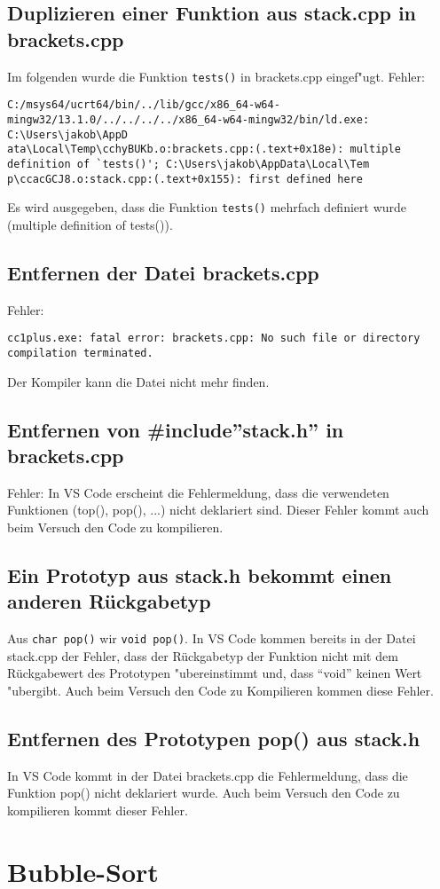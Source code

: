 \documentclass[a4paper,11pt,titlepage]{article}
\begin{document}
\subsection{Duplizieren einer Funktion aus stack.cpp in brackets.cpp}
Im folgenden wurde die Funktion \verb+tests()+ in brackets.cpp eingef"ugt.
Fehler:\\
\begin{verbatim}
C:/msys64/ucrt64/bin/../lib/gcc/x86_64-w64-mingw32/13.1.0/../../../../x86_64-w64-mingw32/bin/ld.exe: C:\Users\jakob\AppD
ata\Local\Temp\cchyBUKb.o:brackets.cpp:(.text+0x18e): multiple definition of `tests()'; C:\Users\jakob\AppData\Local\Tem
p\ccacGCJ8.o:stack.cpp:(.text+0x155): first defined here
\end{verbatim}
Es wird ausgegeben, dass die Funktion \verb+tests()+ mehrfach definiert wurde (multiple definition of tests()).
\subsection{Entfernen der Datei brackets.cpp}
Fehler:\\
\begin{verbatim}
cc1plus.exe: fatal error: brackets.cpp: No such file or directory
compilation terminated.
\end{verbatim}
Der Kompiler kann die Datei nicht mehr finden.
\subsection{Entfernen von \#include''stack.h'' in brackets.cpp}
Fehler: In VS Code erscheint die Fehlermeldung, dass die verwendeten Funktionen (top(), pop(), ...) nicht deklariert sind. Dieser Fehler kommt auch beim Versuch den  Code zu kompilieren.
\subsection{Ein Prototyp aus stack.h bekommt einen anderen Rückgabetyp}
Aus \verb+char pop()+ wir \verb+void pop()+.
In VS Code kommen bereits in der Datei stack.cpp der Fehler, dass der Rückgabetyp der Funktion nicht mit dem Rückgabewert des Prototypen "ubereinstimmt und, dass "`void"' keinen Wert "ubergibt. Auch beim Versuch den Code zu Kompilieren kommen diese Fehler.
\subsection{Entfernen des Prototypen pop() aus stack.h}
In VS Code kommt in der Datei brackets.cpp die Fehlermeldung, dass die Funktion pop() nicht deklariert wurde. Auch beim Versuch den Code zu kompilieren kommt dieser Fehler.
\newpage
\section{Bubble-Sort}

\end{document}
